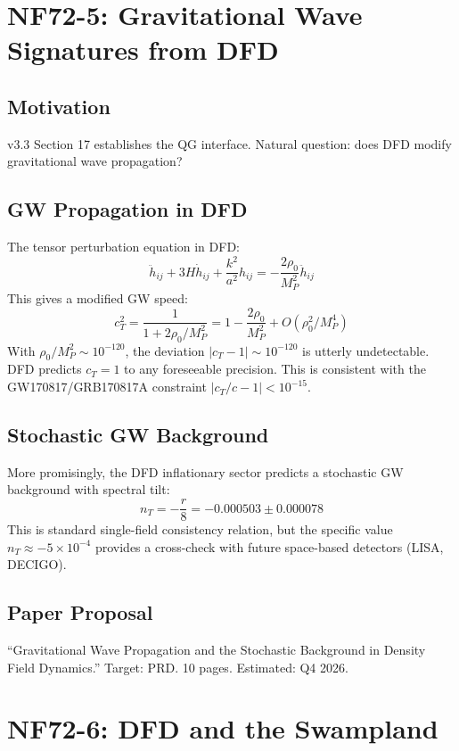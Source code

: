 \documentclass[11pt,a4paper]{article}
\begin{document}
\section{NF72-5: Gravitational Wave Signatures from DFD}

\subsection{Motivation}
v3.3 Section 17 establishes the QG interface. Natural question: does DFD modify gravitational wave propagation?

\subsection{GW Propagation in DFD}
The tensor perturbation equation in DFD:
\[
\ddot{h}_{ij} + 3H\dot{h}_{ij} + \frac{k^2}{a^2}h_{ij} = -\frac{2\rho_0}{M_P^2}\ddot{h}_{ij}
\]
This gives a modified GW speed:
\[
c_T^2 = \frac{1}{1 + 2\rho_0/M_P^2} = 1 - \frac{2\rho_0}{M_P^2} + O(\rho_0^2/M_P^4)
\]
With $\rho_0/M_P^2 \sim 10^{-120}$, the deviation $|c_T - 1| \sim 10^{-120}$ is utterly undetectable. DFD predicts $c_T = 1$ to any foreseeable precision. This is consistent with the GW170817/GRB170817A constraint $|c_T/c - 1| < 10^{-15}$.

\subsection{Stochastic GW Background}
More promisingly, the DFD inflationary sector predicts a stochastic GW background with spectral tilt:
\[
n_T = -\frac{r}{8} = -0.000503 \pm 0.000078
\]
This is standard single-field consistency relation, but the specific value $n_T \approx -5 \times 10^{-4}$ provides a cross-check with future space-based detectors (LISA, DECIGO).

\subsection{Paper Proposal}
``Gravitational Wave Propagation and the Stochastic Background in Density Field Dynamics.'' Target: PRD. 10 pages. Estimated: Q4 2026.

\section{NF72-6: DFD and the Swampland}
\end{document}
